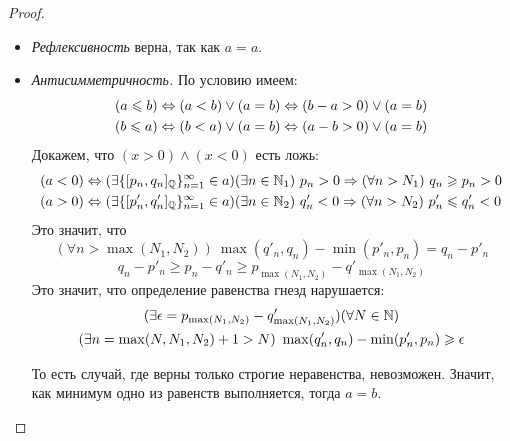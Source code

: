 \begin{proof}~

    \begin{itemize}
        \item \textit{Рефлексивность} верна, так как $a = a$.
        \item \textit{Антисимметричность.} По условию имеем:
            \begin{align*}
                &(a \leqslant b) \Leftrightarrow (a < b) \vee (a = b) \Leftrightarrow (b - a > 0) \vee (a = b) \\
                &(b \leqslant a) \Leftrightarrow (b < a) \vee (a = b) \Leftrightarrow (a - b > 0) \vee (a = b)
            \end{align*}
            Докажем, что $(x > 0) \wedge (x < 0)$ есть ложь:
            \begin{align*}
                &(a < 0) \Leftrightarrow (\exists \{[p_n, q_n]_{\mathbb{Q}}\}_{n = 1}^{\infty} \in a)
                (\exists n \in \mathbb{N}_1)\ p_n > 0 \Rightarrow (\forall n > N_1)\ q_n \geqslant p_n > 0\\
                &(a > 0) \Leftrightarrow (\exists \{[p'_n, q'_n]_{\mathbb{Q}}\}_{n = 1}^{\infty} \in a)
                (\exists n \in \mathbb{N}_2)\ q'_n < 0 \Rightarrow (\forall n > N_2)\ p'_n \leqslant q'_n < 0\\
            \end{align*}
            Это значит, что
            \[
                (\forall n > \max(N_1, N_2))\ \max(q'_n, q_n) - \min(p'_n, p_n) = q_n - p'_n
            \]
            \[
                q_n - p'_n \ge p_n - q'_n \ge p_{\max(N_1, N_2)} - q'_{\max(N_1, N_2)}        
            \]
            Это значит, что определение равенства гнезд нарушается:
            \begin{multline*}
                (\exists \epsilon = p_{\max(N_1, N_2)} - q'_{\max(N_1, N_2)})
                (\forall N \in \mathbb{N})\\ (\exists n = \max(N, N_1, N_2) + 1 > N)
                \ \max(q'_n, q_n) - \min(p'_n, p_n) \geqslant \epsilon
            \end{multline*}

            То есть случай, где верны только строгие неравенства,
            невозможен. Значит, как минимум одно из равенств
            выполняется, тогда $a = b$.
            

\end{itemize}
\end{proof}
